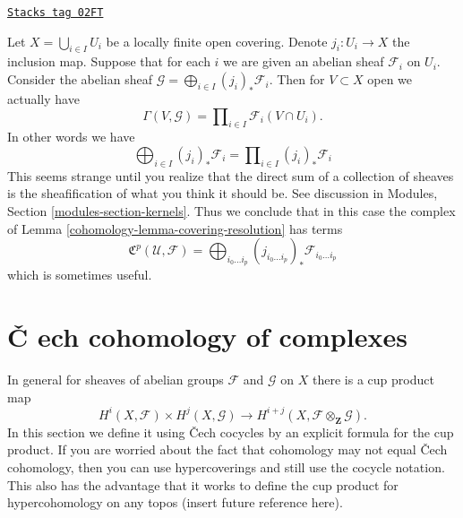 \begin{remark}
\label{cohomology-remark-locally-finite-sections}
\href{https://stacks.math.columbia.edu/tag/02FT}{\texttt{Stacks tag 02FT}}

Let $X = \bigcup_{i \in I} U_i$ be a locally finite open covering.
Denote $j_i : U_i \to X$ the inclusion map. Suppose that for each $i$
we are given an abelian sheaf $\mathcal{F}_i$ on $U_i$. Consider the
abelian sheaf $\mathcal{G} = \bigoplus_{i \in I} (j_i)_*\mathcal{F}_i$.
Then for $V \subset X$ open we actually have
$$
\Gamma(V, \mathcal{G}) = \prod\nolimits_{i \in I} \mathcal{F}_i(V \cap U_i).
$$
In other words we have
$$
\bigoplus\nolimits_{i \in I} (j_i)_*\mathcal{F}_i =
\prod\nolimits_{i \in I} (j_i)_*\mathcal{F}_i
$$
This seems strange until you realize that the direct sum of a collection
of sheaves is the sheafification of what you think it should be.
See discussion in Modules, Section \ref{modules-section-kernels}.
Thus we conclude that in this case the complex of
Lemma \ref{cohomology-lemma-covering-resolution} has terms
$$
{\mathfrak C}^p(\mathcal{U}, \mathcal{F}) =
\bigoplus\nolimits_{i_0 \ldots i_p}
(j_{i_0 \ldots i_p})_* \mathcal{F}_{i_0 \ldots i_p}
$$
which is sometimes useful.
\end{remark}

\section{{\v C}
ech cohomology of complexes}
\label{cohomology-section-cech-cohomology-of-complexes}

In general for sheaves of abelian groups
${\mathcal F}$ and ${\mathcal G}$ on $X$ there is a cup product map
$$
H^i(X, {\mathcal F}) \times H^j(X, {\mathcal G})
\longrightarrow
H^{i + j}(X, {\mathcal F} \otimes_{\mathbf Z} {\mathcal G}).
$$
In this section we define it using {\v C}ech cocycles by an explicit formula
for the cup product. If you are worried about the fact that cohomology may not
equal {\v C}ech cohomology, then you can use hypercoverings and still
use the cocycle notation. This also has the advantage that
it works to define the cup product for hypercohomology on any topos (insert
future reference here).

